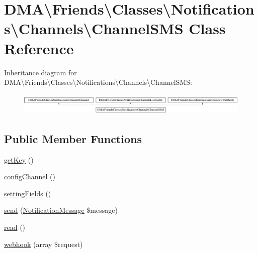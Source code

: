 \hypertarget{classDMA_1_1Friends_1_1Classes_1_1Notifications_1_1Channels_1_1ChannelSMS}{\section{D\-M\-A\textbackslash{}Friends\textbackslash{}Classes\textbackslash{}Notifications\textbackslash{}Channels\textbackslash{}Channel\-S\-M\-S Class Reference}
\label{classDMA_1_1Friends_1_1Classes_1_1Notifications_1_1Channels_1_1ChannelSMS}
}
Inheritance diagram for D\-M\-A\textbackslash{}Friends\textbackslash{}Classes\textbackslash{}Notifications\textbackslash{}Channels\textbackslash{}Channel\-S\-M\-S\-:\begin{figure}[H]
\begin{center}
\leavevmode
\includegraphics[height=1.060606cm]{d2/d14/classDMA_1_1Friends_1_1Classes_1_1Notifications_1_1Channels_1_1ChannelSMS}
\end{center}
\end{figure}
\subsection*{Public Member Functions}
\begin{DoxyCompactItemize}
\item 
\hyperlink{classDMA_1_1Friends_1_1Classes_1_1Notifications_1_1Channels_1_1ChannelSMS_af645c26a2c6baf2e5106a464d7d74d7e}{get\-Key} ()
\item 
\hyperlink{classDMA_1_1Friends_1_1Classes_1_1Notifications_1_1Channels_1_1ChannelSMS_a3b57af73b9e017991e9872232717b686}{config\-Channel} ()
\item 
\hyperlink{classDMA_1_1Friends_1_1Classes_1_1Notifications_1_1Channels_1_1ChannelSMS_aee4d07da05caa5a14b8c126d6ccf2083}{setting\-Fields} ()
\item 
\hyperlink{classDMA_1_1Friends_1_1Classes_1_1Notifications_1_1Channels_1_1ChannelSMS_a74d477bcee51e0a8d4c27e482e775eb8}{send} (\hyperlink{classDMA_1_1Friends_1_1Classes_1_1Notifications_1_1NotificationMessage}{Notification\-Message} \$message)
\item 
\hyperlink{classDMA_1_1Friends_1_1Classes_1_1Notifications_1_1Channels_1_1ChannelSMS_ad07cd397e4a5d268f56cf59c850f1583}{read} ()
\item 
\hyperlink{classDMA_1_1Friends_1_1Classes_1_1Notifications_1_1Channels_1_1ChannelSMS_a64e0d1bb196c93b02f3f208b50574c76}{webhook} (array \$request)
\end{DoxyCompactItemize}


